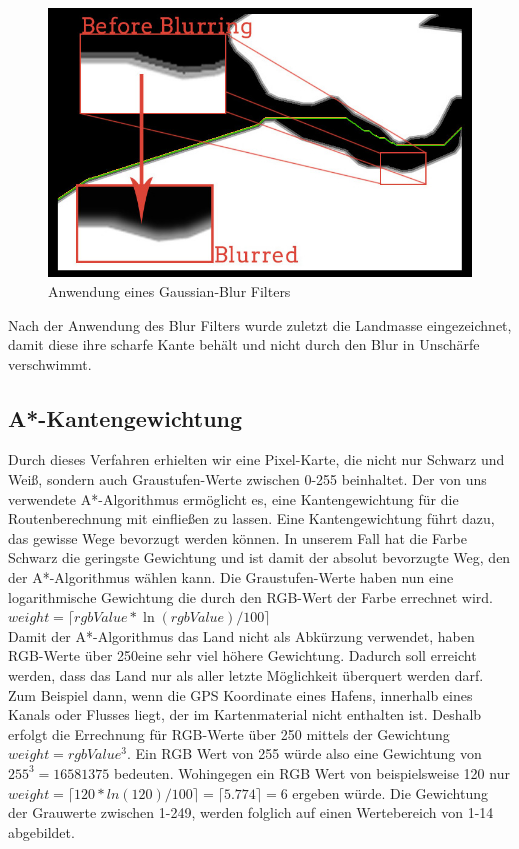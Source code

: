 \documentclass[letterpaper]{article}
\begin{document}
		\begin{figure}[!htbp]
			\centering
			\includegraphics[width=\linewidth]{blur_effect}
			\caption{Anwendung eines Gaussian-Blur Filters}
			\label{fig:blur effect}
		\end{figure}

		Nach der Anwendung des Blur Filters wurde zuletzt die Landmasse eingezeichnet, damit diese ihre scharfe Kante behält und nicht durch den Blur in Unschärfe verschwimmt. 

		\subsection{A*-Kantengewichtung}
			Durch dieses Verfahren erhielten wir eine Pixel-Karte, die nicht nur Schwarz und Weiß, sondern auch Graustufen-Werte zwischen 0-255 beinhaltet. Der von uns verwendete A*-Algorithmus\cite{ginstead14} ermöglicht es, eine Kantengewichtung für die Routenberechnung mit einfließen zu lassen. Eine Kantengewichtung führt dazu, das gewisse Wege bevorzugt werden können. In unserem Fall hat die Farbe Schwarz die geringste Gewichtung und ist damit der absolut bevorzugte Weg, den der A*-Algorithmus wählen kann. Die Graustufen-Werte haben nun eine logarithmische Gewichtung die durch den RGB-Wert der Farbe errechnet wird.\\

			$weight = \lceil rgbValue * \ln{(rgbValue)/100} \rceil$\\

			Damit der A*-Algorithmus das Land nicht als Abkürzung verwendet, haben RGB-Werte über 250\footnotemark eine sehr viel höhere Gewichtung. Dadurch soll erreicht werden, dass das Land nur als aller letzte Möglichkeit überquert werden darf. Zum Beispiel dann, wenn die GPS Koordinate eines Hafens, innerhalb eines Kanals oder Flusses liegt, der im Kartenmaterial nicht enthalten ist. Deshalb erfolgt die Errechnung für RGB-Werte über 250 mittels der Gewichtung $weight = rgbValue^3$. Ein RGB Wert von 255 würde also eine Gewichtung von $255^3 = 16581375$ bedeuten. Wohingegen ein RGB Wert von beispielsweise 120 nur $ weight = \lceil 120 * ln(120)/100 \rceil = \lceil 5.774 \rceil = 6 $ ergeben würde. Die Gewichtung der Grauwerte zwischen 1-249, werden folglich auf einen Wertebereich von 1-14 abgebildet.\\
\end{document}
